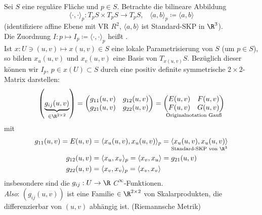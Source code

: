 \begin{remark}
  Sei $ S $ eine reguläre Fläche und $ p \in S $. Betrachte die bilineare Abbildung
  \begin{equation*}
    \langle \cdot, \cdot \rangle_p : T_pS \times T_pS \to T_pS\text{,} \quad \langle a, b \rangle_p \coloneqq \langle a, b \rangle
  \end{equation*}
  (identifiziere affine Ebene mit VR $ R^2 $, $ \langle a, b \rangle $ ist Standard-SKP in $ \R^3 $). \\
  Die Zuordnung $ I: p \mapsto I_p \coloneqq \langle \cdot, \cdot \rangle_p $ heißt \label{def:ersteFundamentalform}. \\
  Ist $ x: U \ni (u,v) \mapsto x(u,v) \in S $ eine lokale Parametrisierung von $ S $ (um $ p \in S $), so bilden $ x_u(u,v) $ und $ x_v(u,v) $ eine Basis von $ T_{x(u,v)}S $. Bezüglich dieser können wir $ I_p $, $ p \in x(U) \subset S $ durch eine positiv definite symmetrische $ 2 \times 2 $-Matrix darstellen:
  \begin{equation*}
      \left( \underbrace{g_{ij}(u,v)}_{\in \R^{2 \times 2}} \right) = \begin{pmatrix}
        g_{11}(u,v) & g_{12}(u,v) \\
        g_{21}(u,v) & g_{22}(u,v)
      \end{pmatrix} = \underset{\text{Originalnotation Gauß}}{\begin{pmatrix}
        E(u,v) & F(u,v) \\
        F(u,v) & G(u,v)
      \end{pmatrix}}
  \end{equation*}
  mit
  \begin{align*}
    g_{11}(u,v) = E(u,v) &= \langle x_u(u,v),x_u(u,v) \rangle_p = \underset{\text{Standard-SKP von }\R^3}{\langle x_u(u,v),x_u(u,v) \rangle} \\
    g_{12}(u,v) &= \langle x_u, x_v \rangle_p = \langle x_v, x_u \rangle = g_{21}(u,v) \\
    g_{22}(u,v) &= \langle x_v, x_v \rangle_p = \langle x_v, x_v \rangle
  \end{align*}
  insbesondere sind die $ g_{ij}: U \to \R $ $ C^\infty $-Funktionen. \\
  \emph{Also}: $ \left( g_{ij}(u,v) \right) $ ist eine Familie $ \in \R^{2\times 2} $ von Skalarprodukten, die differenzierbar von $ (u,v) $ abhängig ist. (Riemannsche Metrik)
\end{remark}


